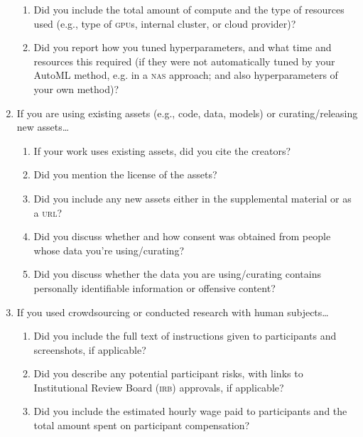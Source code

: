 \documentclass[11pt]{article}
\begin{document}
\begin{enumerate}
\begin{enumerate}
  \item Did you include the total amount of compute and the type of resources
    used (e.g., type of \textsc{gpu}s, internal cluster, or cloud provider)?
  \item Did you report how you tuned hyperparameters, and what time and
    resources this required (if they were not automatically tuned by your AutoML
    method, e.g. in a \textsc{nas} approach; and also hyperparameters of your
    own method)?
  \end{enumerate}
\item If you are using existing assets (e.g., code, data, models) or
  curating/releasing new assets\dots
  \begin{enumerate}
  \item If your work uses existing assets, did you cite the creators?
  \item Did you mention the license of the assets?
  \item Did you include any new assets either in the supplemental material or as
    a \textsc{url}?
  \item Did you discuss whether and how consent was obtained from people whose
    data you're using/curating?
  \item Did you discuss whether the data you are using/curating contains
    personally identifiable information or offensive content?
  \end{enumerate}
\item If you used crowdsourcing or conducted research with human subjects\dots
  \begin{enumerate}
  \item Did you include the full text of instructions given to participants and
    screenshots, if applicable?
    \answerNA{}
  \item Did you describe any potential participant risks, with links to
    Institutional Review Board (\textsc{irb}) approvals, if applicable?
    \answerNA{}
  \item Did you include the estimated hourly wage paid to participants and the
    total amount spent on participant compensation?
    \answerNA{}
  \end{enumerate}
\end{enumerate}
\end{document}
